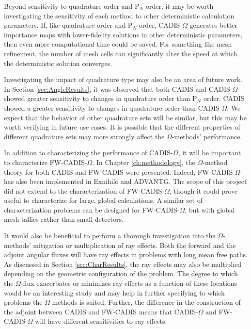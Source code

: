Beyond sensitivity to quadrature order and P$_N$ order, it may be worth
investigating the sensitivity of each method to other deterministic calculation
parameters. If, like quadrature order and P$_N$ order, CADIS-$\Omega$ generates
better importance maps with lower-fidelity solutions in other deterministic
parameters, then even more
computational time could be saved.
For something like
mesh refinement, the number of mesh cells can significantly alter the
speed at which the deterministic solution converges.

Investigating the impact of quadrature type may also be an area of future work.
In Section \ref{sec:AngleResults}, it was observed that both CADIS and
CADIS-$\Omega$ showed greater sensitivity to changes in quadrature order than
P$_N$ order. CADIS showed a greater sensitivity to changes in quadrature order
than CADIS-$\Omega$. We expect that the behavior of other quadrature sets will
be similar, but this may be worth verifying in future use cases. It is possible
that the different properties of different quadrature sets may more strongly
affect the $\Omega$-methods' performance.

In addition to characterizing the performance of CADIS-$\Omega$, it will be
important to characterize FW-CADIS-$\Omega$. In Chapter \ref{ch:methodology},
the $\Omega$-method theory for both CADIS and FW-CADIS were presented. Indeed,
FW-CADIS-$\Omega$ has also been implemented in Exnihilo and ADVANTG. The scope
of this project did not extend to the characterization of FW-CADIS-$\Omega$,
though
it could prove useful to characterize for large, global calculations. A similar
set of characterization problems can be designed for FW-CADIS-$\Omega$, but with
global mesh tallies rather than small detectors.

It would also be beneficial to
perform a thorough investigation into the $\Omega$-methods' mitigation or
multiplication of ray effects. Both the forward and the adjoint angular fluxes
will have ray effects in problems with long mean free paths. As discussed in
Section \ref{sec:CharResults},
the ray effects may also be multiplied depending on the geometric
configuration of the problem. The degree to which the $\Omega$-flux exacerbates
or minimizes ray effects as a function of these locations would be an
interesting study and may help in further specifying to which problems the
$\Omega$-methods is suited. Further, the difference in the construction of the
adjoint between CADIS and FW-CADIS means that CADIS-$\Omega$ and
FW-CADIS-$\Omega$ will have different sensitivities to ray effects.

